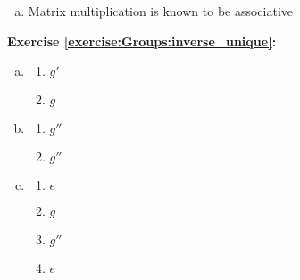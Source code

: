 \begin{enumerate}[(a)]
\item
Matrix multiplication is known to be associative
\end{enumerate}

\noindent\textbf{Exercise \ref{exercise:Groups:inverse_unique}:}
\begin{enumerate}[(a)]
\item
	\begin{multicols}{2}
	\begin{enumerate}[1.]
	\item
	$g'$
	
	\item
	$g$
	\end{enumerate}
	\end{multicols}
	
\item
	\begin{multicols}{2}
	\begin{enumerate}[1.]
	\item
	$g''$
	
	\item
	$g''$
	\end{enumerate}
	\end{multicols}
	
\item
	\begin{multicols}{2}
	\begin{enumerate}[1.]
	\item
	$e$
	
	\item
	$g$
	
	\item
	$g''$
	
	\item
	$e$
	\end{enumerate}
	\end{multicols}
\end{enumerate}

